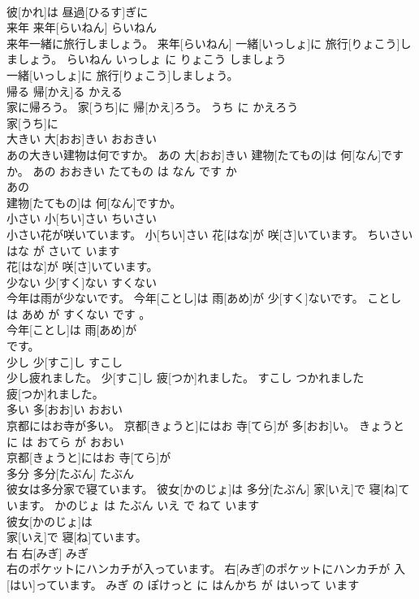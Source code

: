 \documentclass[8pt]{extreport}
\begin{document}
\begin{CJK}{UTF8}{min}
\\	彼[かれ]は 昼過[ひるす]ぎに
\\	来年	来年[らいねん]	らいねん	
\\	来年一緒に旅行しましょう。	来年[らいねん] 一緒[いっしょ]に 旅行[りょこう]しましょう。	らいねん いっしょ に りょこう しましょう	
\\	一緒[いっしょ]に 旅行[りょこう]しましょう。			
\\	帰る	帰[かえ]る	かえる	
\\	家に帰ろう。	家[うち]に 帰[かえ]ろう。	うち に かえろう	
\\	家[うち]に
\\	大きい	大[おお]きい	おおきい	
\\	あの大きい建物は何ですか。	あの 大[おお]きい 建物[たてもの]は 何[なん]ですか。	あの おおきい たてもの は なん です か	
\\	あの
\\	建物[たてもの]は 何[なん]ですか。			
\\	小さい	小[ちい]さい	ちいさい	
\\	小さい花が咲いています。	小[ちい]さい 花[はな]が 咲[さ]いています。	ちいさい はな が さいて います	
\\	花[はな]が 咲[さ]いています。			
\\	少ない	少[すく]ない	すくない	
\\	今年は雨が少ないです。	今年[ことし]は 雨[あめ]が 少[すく]ないです。	ことし は あめ が すくない です 。	
\\	今年[ことし]は 雨[あめ]が
\\	です。			
\\	少し	少[すこ]し	すこし	
\\	少し疲れました。	少[すこ]し 疲[つか]れました。	すこし つかれました	
\\	疲[つか]れました。			
\\	多い	多[おお]い	おおい	
\\	京都にはお寺が多い。	京都[きょうと]にはお 寺[てら]が 多[おお]い。	きょうと に は おてら が おおい	
\\	京都[きょうと]にはお 寺[てら]が
\\	多分	多分[たぶん]	たぶん	
\\	彼女は多分家で寝ています。	彼女[かのじょ]は 多分[たぶん] 家[いえ]で 寝[ね]ています。	かのじょ は たぶん いえ で ねて います	
\\	彼女[かのじょ]は
\\	家[いえ]で 寝[ね]ています。			
\\	右	右[みぎ]	みぎ	
\\	右のポケットにハンカチが入っています。	右[みぎ]のポケットにハンカチが 入[はい]っています。	みぎ の ぽけっと に はんかち が はいって います	

\end{CJK}
\end{document}
